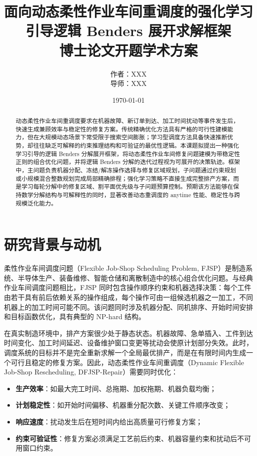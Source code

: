 \documentclass[UTF8,12pt,a4paper]{ctexart}
\title{面向动态柔性作业车间重调度的强化学习引导逻辑 Benders 展开求解框架\\
\large 博士论文开题学术方案}
\author{作者：XXX\\导师：XXX}
\date{\today}
\begin{document}
\maketitle

\begin{abstract}
动态柔性作业车间重调度要求在机器故障、新订单到达、加工时间扰动等事件发生后，快速生成兼顾效率与稳定性的修复方案。传统精确优化方法具有严格的可行性建模能力，但在大规模动态场景下常受限于搜索空间膨胀；学习型调度方法具备快速推断优势，却往往缺乏可解释的约束推理结构和可验证的最优性逻辑。本课题拟提出一种强化学习引导的逻辑 Benders 分解展开框架，将动态柔性作业车间修复问题建模为带稳定性正则的组合优化问题，并将逻辑 Benders 分解的迭代过程视为可展开的决策轨迹。框架中，主问题负责机器分配、冻结/解冻操作选择与修复区域规划，子问题通过约束规划或小规模混合整数规划完成局部精确排程；强化学习策略不直接生成完整排产方案，而是学习每轮分解中的修复区域、割平面优先级与子问题预算控制。预期该方法能够在保持数学分解结构与可解释性的同时，显著改善动态重调度的 anytime 性能、稳定性与跨规模泛化能力。
\end{abstract}

\section{研究背景与动机}

柔性作业车间调度问题（Flexible Job-Shop Scheduling Problem, FJSP）是制造系统、半导体生产、装备维修、智能仓储和离散制造中的核心组合优化问题。与经典作业车间调度问题相比，FJSP 同时包含操作顺序约束和机器选择决策：每个工件由若干具有前后依赖关系的操作组成，每个操作可由一组候选机器之一加工，不同机器上的加工时间可能不同。该问题同时涉及机器分配、同机排序、开始时间安排和目标函数优化，具有典型的 NP-hard 结构\cite{ref_fjsp_survey,ref_scheduling_book}。

在真实制造环境中，排产方案很少处于静态状态。机器故障、急单插入、工件到达时间变化、加工时间延迟、设备维护窗口变更等扰动会使原计划部分失效。此时，调度系统的目标并不是完全重新求解一个全局最优排产，而是在有限时间内生成一个可行且稳定的修复方案。因此，动态柔性作业车间重调度（Dynamic Flexible Job-Shop Rescheduling, DFJSP-Repair）需要同时优化：
\begin{itemize}
    \item \textbf{生产效率}：如最大完工时间、总拖期、加权拖期、机器负载均衡；
    \item \textbf{计划稳定性}：如开始时间偏移、机器重分配次数、关键工件顺序改变；
    \item \textbf{响应速度}：扰动发生后在短时间内给出高质量可行修复方案；
    \item \textbf{约束可验证性}：修复方案必须满足工艺前后约束、机器容量约束和扰动后不可用窗口约束。
\end{itemize}
\end{document}
